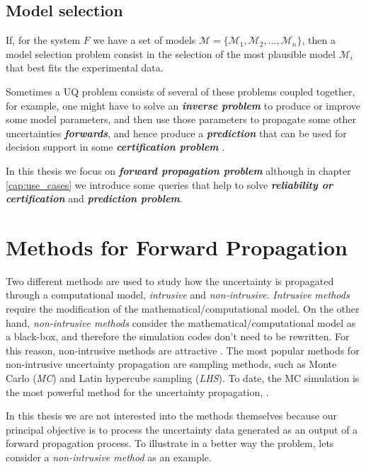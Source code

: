 \subsection{Model selection}
If, for the system $F$ we have a set of models $\mathcal{M} = \lbrace \mathcal{M}_{1}, \mathcal{M}_{2},...,\mathcal{M}_{n} \rbrace$, then a model selection problem consist in the selection of the most plausible model $\mathcal{M}_{i}$ that best fits the experimental data.

Sometimes a UQ problem consists of several of these problems coupled together, for example, one might have to solve an \textbf{\textit{inverse problem}} to produce or improve some model parameters, and then use those parameters to propagate some other uncertainties \textbf{\textit{forwards}}, and hence produce a \textbf{\textit{prediction}} that can be used for decision support in some \textbf{\textit{certification problem}} \cite{Sullivan2015}.

In this thesis we focus on \textbf{\textit{forward propagation problem}} although in chapter \ref{cap:use_cases} we introduce some queries that help to solve \textbf{\textit{reliability or certification}} and \textbf{\textit{prediction problem}}.

\section{Methods for Forward Propagation}\label{sec:methods_uq_propagation}

Two different methods are used to study how the uncertainty is propagated through a computational model, \textit{intrusive} and \textit{non-intrusive}. \textit{Intrusive methods} require the modification of the mathematical/computational model. On the other hand, \textit{non-intrusive methods} consider the mathematical/computational model as a black-box, and therefore the simulation codes don't need to be rewritten. For this reason, non-intrusive methods are attractive \cite{Kawai2014}. The most popular methods for non-intrusive uncertainty propagation are sampling methods, such as Monte Carlo (\textit{MC}) and Latin hypercube sampling (\textit{LHS}). To date, the MC simulation is the most powerful method for the uncertainty propagation, \cite{Rajan2016}.

In this thesis we are not interested into the methods themselves because our principal objective is to process the uncertainty data generated as an output of a forward propagation process. To illustrate in a better way the problem, lets consider a \textit{non-intrusive method} as an example.

